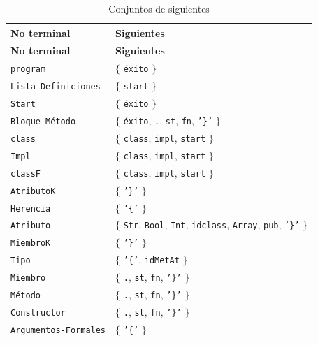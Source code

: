\begingroup
\small
\renewcommand{\arraystretch}{1.2}
\setlength{\tabcolsep}{5pt}
\setlength{\LTleft}{0pt}
\setlength{\LTright}{0pt plus 1fill}
\begin{longtable}{|
>{\raggedright\arraybackslash}p{}|
>{\raggedright\arraybackslash}p{}|}
\caption{Conjuntos de siguientes}
\label{tab:siguientes}\\
\hline
\textbf{No terminal} & \textbf{Siguientes} \\ \hline
\endfirsthead
\hline
\textbf{No terminal} & \textbf{Siguientes} \\ \hline
\endhead
\texttt{program} & \(\{\) \texttt{éxito} \(\}\) \\ \hline
\texttt{Lista-Definiciones} & \(\{\) \texttt{start} \(\}\) \\ \hline
\texttt{Start} & \(\{\) \texttt{éxito} \(\}\) \\ \hline
\texttt{Bloque-Método} & \(\{\) \texttt{éxito}, \texttt{.}, \texttt{st}, \texttt{fn}, \texttt{'\}'} \(\}\) \\ \hline
\texttt{class} & \(\{\) \texttt{class}, \texttt{impl}, \texttt{start} \(\}\) \\ \hline
\texttt{Impl} & \(\{\) \texttt{class}, \texttt{impl}, \texttt{start} \(\}\) \\ \hline
\texttt{classF} & \(\{\) \texttt{class}, \texttt{impl}, \texttt{start} \(\}\) \\ \hline
\texttt{AtributoK} & \(\{\) \texttt{'\}'} \(\}\) \\ \hline
\texttt{Herencia} & \(\{\) \texttt{'\{'} \(\}\) \\ \hline
\texttt{Atributo} & \(\{\) \texttt{Str}, \texttt{Bool}, \texttt{Int}, \texttt{idclass}, \texttt{Array}, \texttt{pub}, \texttt{'\}'} \(\}\) \\ \hline
\texttt{MiembroK} & \(\{\) \texttt{'\}'} \(\}\) \\ \hline
\texttt{Tipo} & \(\{\) \texttt{'\{'}, \texttt{idMetAt} \(\}\) \\ \hline
\texttt{Miembro} & \(\{\) \texttt{.}, \texttt{st}, \texttt{fn}, \texttt{'\}'} \(\}\) \\ \hline
\texttt{Método} & \(\{\) \texttt{.}, \texttt{st}, \texttt{fn}, \texttt{'\}'} \(\}\) \\ \hline
\texttt{Constructor} & \(\{\) \texttt{.}, \texttt{st}, \texttt{fn}, \texttt{'\}'} \(\}\) \\ \hline
\texttt{Argumentos-Formales} & \(\{\) \texttt{'\{'} \(\}\) \\ \hline

\end{longtable}
